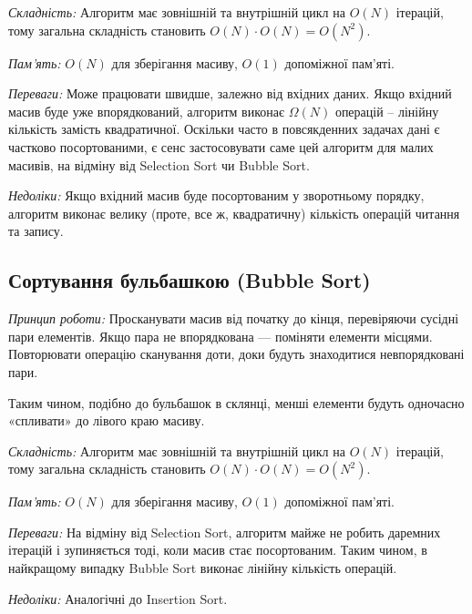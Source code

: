\documentclass[12pt,a4paper]{report}
\begin{document}
\begin{minipage}{\linewidth}

\end{minipage}

\emph{Складність:} Алгоритм має зовнішній та внутрішній цикл на \(O(N)\) ітерацій, тому загальна складність становить \(O(N) \cdot O(N) = O(N^2)\).

\emph{Пам’ять:} \(O(N)\) для зберігання масиву, \(O(1)\) допоміжної пам’яті.

\emph{Переваги:} Може працювати швидше, залежно від вхідних даних. Якщо вхідний масив буде уже впорядкований, алгоритм виконає \(\Omega(N)\) операцій -- лінійну кількість замість квадратичної. Оскільки часто в повсякденних задачах дані є частково посортованими, є сенс застосовувати саме цей алгоритм для малих масивів, на відміну від Selection Sort чи Bubble Sort.

\emph{Недоліки:} Якщо вхідний масив буде посортованим у зворотньому порядку, алгоритм виконає велику (проте, все ж, квадратичну) кількість операцій читання та запису.


\subsection{Сортування бульбашкою (Bubble Sort)}

\emph{Принцип роботи:} Просканувати масив від початку до кінця, перевіряючи сусідні пари елементів. Якщо пара не впорядкована --- поміняти елементи місцями. Повторювати операцію сканування доти, доки будуть знаходитися невпорядковані пари.

Таким чином, подібно до бульбашок в склянці, менші елементи будуть одночасно «спливати» до лівого краю масиву.

\begin{minipage}{\linewidth}

\end{minipage}

\emph{Складність:} Алгоритм має зовнішній та внутрішній цикл на \(O(N)\) ітерацій, тому загальна складність становить \(O(N) \cdot O(N) = O(N^2)\).

\emph{Пам’ять:} \(O(N)\) для зберігання масиву, \(O(1)\) допоміжної пам’яті.

\emph{Переваги:} На відміну від Selection Sort, алгоритм майже не робить даремних ітерацій і зупиняється тоді, коли масив стає посортованим. Таким чином, в найкращому випадку Bubble Sort виконає лінійну кількість операцій.

\emph{Недоліки:} Аналогічні до Insertion Sort.
\end{document}
